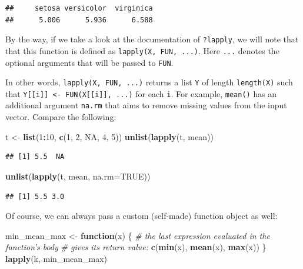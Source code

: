 \documentclass[10pt,b5paper,krantz1]{krantz}
\newenvironment{Shaded}{\begin{snugshade}}{\end{snugshade}}
\newcommand{\CommentTok}[1]{\textcolor[rgb]{0.37,0.37,0.37}{\textit{#1}}}
\newcommand{\ControlFlowTok}[1]{\textcolor[rgb]{0.27,0.27,0.27}{\textbf{#1}}}
\newcommand{\DataTypeTok}[1]{\textcolor[rgb]{0.27,0.27,0.27}{#1}}
\newcommand{\DecValTok}[1]{\textcolor[rgb]{0.06,0.06,0.06}{#1}}
\newcommand{\KeywordTok}[1]{\textcolor[rgb]{0.27,0.27,0.27}{\textbf{#1}}}
\newcommand{\NormalTok}[1]{#1}
\newcommand{\OperatorTok}[1]{\textcolor[rgb]{0.43,0.43,0.43}{\textbf{#1}}}
\newcommand{\OtherTok}[1]{\textcolor[rgb]{0.37,0.37,0.37}{#1}}
\newcommand{\StringTok}[1]{\textcolor[rgb]{0.5,0.5,0.5}{#1}}
\begin{document}
\begin{verbatim}
##     setosa versicolor  virginica 
##      5.006      5.936      6.588
\end{verbatim}

By the way, if we take a look at the documentation of \texttt{?lapply},
we will note that that this function is defined as \texttt{lapply(X,\ FUN,\ ...)}.
Here \texttt{...} denotes the optional arguments that will be passed to \texttt{FUN}.

In other words, \texttt{lapply(X,\ FUN,\ ...)} returns a list \texttt{Y} of length \texttt{length(X)}
such that \texttt{Y{[}{[}i{]}{]}\ \textless{}-\ FUN(X{[}{[}i{]}{]},\ ...)} for each \texttt{i}.
For example, \texttt{mean()} has an additional argument \texttt{na.rm} that
aims to remove missing values from the input vector.
Compare the following:

\begin{Shaded}
\begin{Highlighting}[]
\NormalTok{t <-}\StringTok{ }\KeywordTok{list}\NormalTok{(}\DecValTok{1}\OperatorTok{:}\DecValTok{10}\NormalTok{, }\KeywordTok{c}\NormalTok{(}\DecValTok{1}\NormalTok{, }\DecValTok{2}\NormalTok{, }\OtherTok{NA}\NormalTok{, }\DecValTok{4}\NormalTok{, }\DecValTok{5}\NormalTok{))}
\KeywordTok{unlist}\NormalTok{(}\KeywordTok{lapply}\NormalTok{(t, mean))}
\end{Highlighting}
\end{Shaded}

\begin{verbatim}
## [1] 5.5  NA
\end{verbatim}

\begin{Shaded}
\begin{Highlighting}[]
\KeywordTok{unlist}\NormalTok{(}\KeywordTok{lapply}\NormalTok{(t, mean, }\DataTypeTok{na.rm=}\OtherTok{TRUE}\NormalTok{))}
\end{Highlighting}
\end{Shaded}

\begin{verbatim}
## [1] 5.5 3.0
\end{verbatim}

Of course, we can always pass a custom (self-made) function object as well:

\begin{Shaded}
\begin{Highlighting}[]
\NormalTok{min_mean_max <-}\StringTok{ }\ControlFlowTok{function}\NormalTok{(x) \{}
    \CommentTok{# the last expression evaluated in the function's body}
    \CommentTok{# gives its return value:}
    \KeywordTok{c}\NormalTok{(}\KeywordTok{min}\NormalTok{(x), }\KeywordTok{mean}\NormalTok{(x), }\KeywordTok{max}\NormalTok{(x))}
\NormalTok{\}}
\KeywordTok{lapply}\NormalTok{(k, min_mean_max)}
\end{Highlighting}
\end{Shaded}
\end{document}
